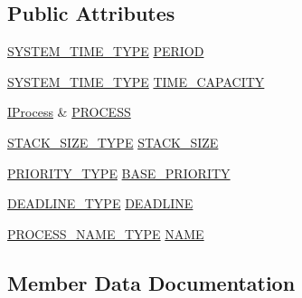 \subsection*{Public Attributes}
\begin{DoxyCompactItemize}
\item 
\hyperlink{apex__types_8h_a78cd52c2621ddf2eda68fcd4bedbc1a7}{S\+Y\+S\+T\+E\+M\+\_\+\+T\+I\+M\+E\+\_\+\+T\+Y\+PE} \hyperlink{structAPP__ATTRIBUTE__TYPE_a47b84ff0600db67ef9aa39d83a331955}{P\+E\+R\+I\+OD}
\item 
\hyperlink{apex__types_8h_a78cd52c2621ddf2eda68fcd4bedbc1a7}{S\+Y\+S\+T\+E\+M\+\_\+\+T\+I\+M\+E\+\_\+\+T\+Y\+PE} \hyperlink{structAPP__ATTRIBUTE__TYPE_ab25da03c2b34897d67cafff51e29a245}{T\+I\+M\+E\+\_\+\+C\+A\+P\+A\+C\+I\+TY}
\item 
\hyperlink{classIProcess}{I\+Process} \& \hyperlink{structAPP__ATTRIBUTE__TYPE_a058460c2ea56888e4475bc2459109b0f}{P\+R\+O\+C\+E\+SS}
\item 
\hyperlink{apex__process_8h_a88a1e60035e9edf9ff430765543659b2}{S\+T\+A\+C\+K\+\_\+\+S\+I\+Z\+E\+\_\+\+T\+Y\+PE} \hyperlink{structAPP__ATTRIBUTE__TYPE_a7a3ca2ad2e76aa9643e5338934326ee2}{S\+T\+A\+C\+K\+\_\+\+S\+I\+ZE}
\item 
\hyperlink{apex__process_8h_a2185443fe5bfda31ff9cce2071f1b18c}{P\+R\+I\+O\+R\+I\+T\+Y\+\_\+\+T\+Y\+PE} \hyperlink{structAPP__ATTRIBUTE__TYPE_a6bdb572015a03ef421f829030f6c7f9b}{B\+A\+S\+E\+\_\+\+P\+R\+I\+O\+R\+I\+TY}
\item 
\hyperlink{apex__process_8h_a930759cec98a9372ee6b92c4c20223fe}{D\+E\+A\+D\+L\+I\+N\+E\+\_\+\+T\+Y\+PE} \hyperlink{structAPP__ATTRIBUTE__TYPE_ae5e63ade4f66e5781611efa15681255d}{D\+E\+A\+D\+L\+I\+NE}
\item 
\hyperlink{apex__process_8h_a50887e4c49611fad19176906f38db47c}{P\+R\+O\+C\+E\+S\+S\+\_\+\+N\+A\+M\+E\+\_\+\+T\+Y\+PE} \hyperlink{structAPP__ATTRIBUTE__TYPE_afdedeaea6179501d4e5d87843b5c88a2}{N\+A\+ME}
\end{DoxyCompactItemize}


\subsection{Member Data Documentation}
